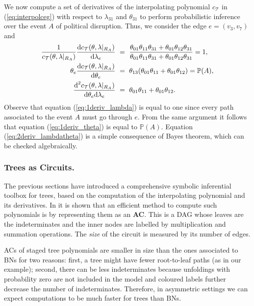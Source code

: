 {\begin{example}\label{bsp:derivatives}
We now compute a set of derivatives of the interpolating polynomial $c_\mathcal{T}$ in (\ref{eq:interpolceg}) with respect to $\lambda_{31}$ and $\theta_{31}$ to perform probabilistic inference over the event $A$ of political disruption. Thus, we consider the edge $e=(v_3,v_7)$ and
\begin{align}
\frac{1}{c_\mathcal{T}(\theta,\lambda|_{R_A})}\frac{\dr c_\mathcal{T}(\theta,\lambda|_{R_A})}{\dr \lambda_e}&~=~\frac{\theta_{01}\theta_{11}\theta_{31}+\theta_{01}\theta_{12}\theta_{31}}{\theta_{01}\theta_{11}\theta_{31}+\theta_{01}\theta_{12}\theta_{31}}=1,\label{eq:1deriv_lambda}\\
\theta_e\frac{\dr c_\mathcal{T}(\theta,\lambda|_{R_A})}{\dr \theta_e}&~=~\theta_{13}(\theta_{01}\theta_{11}+\theta_{01}\theta_{12})=\mathbb{P}(A)\label{eq:1deriv_theta},\\
\frac{\dr^2 c_\mathcal{T}(\theta,\lambda|_{R_A})}{\dr \theta_e \dr \lambda_e}&~=~\theta_{01}\theta_{11}+\theta_{01}\theta_{12}.\label{eq:2deriv_lambdatheta}
\end{align}
Observe that equation (\ref{eq:1deriv_lambda}) is equal to one since every path associated to the event $A$ must go through $e$. From the same argument it follows that equation  (\ref{eq:1deriv_theta}) is equal to $\mathbb{P}(A)$. Equation (\ref{eq:2deriv_lambdatheta}) is a simple consequence of Bayes theorem, which can be checked algebraically. 
\end{example}

\subsubsection{Trees as Circuits.}\label{sect:circuit}
The previous sections have introduced a comprehensive symbolic inferential toolbox for trees, based on the computation of the interpolating polynomial and its derivatives. In \cite{Darwiche2003} it is shown that an efficient method to compute such polynomials is by representing them as an \textbf{AC}. This is a DAG whose leaves are the indeterminates and the inner nodes are labelled by multiplication and summation operations. The \emph{size} of  the circuit is measured by its number of edges.

ACs of staged tree polynomials are smaller in size than the ones associated to BNs for two reasons: first, a tree might have fewer root-to-leaf paths (as in our example); second, there can be less indeterminates because unfoldings with probability zero are not included in the model and coloured labels further decrease the number of indeterminates. Therefore, in asymmetric settings we can expect computations to be much faster for trees than BNs.

}
